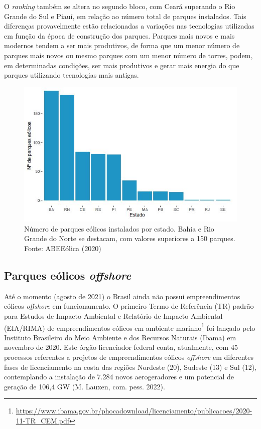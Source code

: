 \documentclass[
  oneside]{scrbook}
\DeclareRobustCommand{\href}[2]{#2\footnote{\url{#1}}}
\begin{document}
O \emph{ranking} também se altera no segundo bloco, com Ceará superando o Rio Grande do Sul e Piauí, em relação ao número total de parques instalados. Tais diferenças provavelmente estão relacionadas a variações nas tecnologias utilizadas em função da época de construção dos parques. Parques mais novos e mais modernos tendem a ser mais produtivos, de forma que um menor número de parques mais novos ou mesmo parques com um menor número de torres, podem, em determinadas condições, ser mais produtivos e gerar mais energia do que parques utilizando tecnologias mais antigas.

\begin{figure}[H]

{\centering \includegraphics[width=0.65\linewidth]{imagens/cap01/Figura_1.6} 

}

\caption{Número de parques eólicos instalados por estado. Bahia e Rio Grande do Norte se destacam, com valores superiores a 150 parques. Fonte: ABEEólica (2020)}\label{fig:06}
\end{figure}

\hypertarget{parques-euxf3licos-offshore}{%
\subsection{\texorpdfstring{Parques eólicos \emph{offshore}}{Parques eólicos offshore}}\label{parques-euxf3licos-offshore}}

Até o momento (agosto de 2021) o Brasil ainda não possui empreendimentos eólicos \emph{offshore} em funcionamento. O primeiro \href{https://www.ibama.gov.br/phocadownload/licenciamento/publicacoes/2020-11-TR_CEM.pdf}{Termo de Referência (TR) padrão para Estudos de Impacto Ambiental e Relatório de Impacto Ambiental (EIA/RIMA) de empreendimentos eólicos em ambiente marinho} foi lançado pelo Instituto Brasileiro do Meio Ambiente e dos Recursos Naturais (Ibama) em novembro de 2020. Este órgão licenciador federal conta, atualmente, com 45 processos referentes a projetos de empreendimentos eólicos \emph{offshore} em diferentes fases de licenciamento na costa das regiões Nordeste (20), Sudeste (13) e Sul (12), contemplando a instalação de 7.284 novos aerogeradores e um potencial de geração de 106,4 GW (M. Lauxen, com. pess. 2022).
\end{document}

